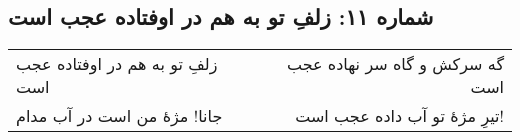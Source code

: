 \begin{center}
\section*{شماره ۱۱: زلفِ تو به هم در اوفتاده عجب است}
\label{sec:011}
\begin{longtable}{l p{0.5cm} r}
زلفِ تو به هم در اوفتاده عجب است
&&
گه سرکش و گاه سر نهاده عجب است
\\
جانا! مژهٔ من است در آب مدام
&&
تیرِ مژهٔ تو آب داده عجب است!
\\
\end{longtable}
\end{center}
